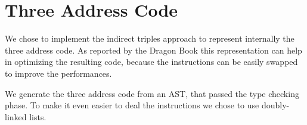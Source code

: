 \section{Three Address Code}
We chose to implement the indirect triples approach to represent internally
the three address code. As reported by the Dragon Book this representation 
can help in optimizing the resulting code, because the instructions can be 
easily swapped to improve the performances.

We generate the three address code from an AST, that passed the type checking
phase. To make it even easier to deal the instructions we chose to use 
doubly-linked lists.
